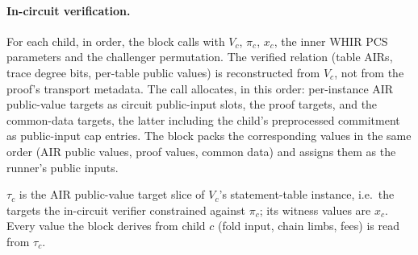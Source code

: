 \paragraph{In-circuit verification.}
For each child, in order, the block calls
 with $V_c$, $\pi_c$, $x_c$, the
inner WHIR PCS parameters and the  challenger
permutation.
The verified relation (table AIRs, trace degree bits, per-table public values) is
reconstructed from $V_c$, not from the proof's transport metadata.
The call allocates, in this order: per-instance AIR public-value targets as
circuit public-input slots, the proof targets, and the common-data targets, the
latter including the child's preprocessed commitment as public-input cap entries.
The block packs the corresponding values in the same order (AIR public values,
proof values, common data) and assigns them as the runner's public inputs.

\begin{definition}
$\tau_c$ is the AIR public-value target slice of $V_c$'s statement-table instance,
i.e.\ the targets the in-circuit verifier constrained against $\pi_c$; its witness
values are $x_c$.
Every value the block derives from child $c$ (fold input, chain limbs, fees) is
read from $\tau_c$. 
\end{definition}

